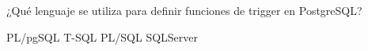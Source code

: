 \question[1] ¿Qué lenguaje se utiliza para definir funciones de trigger en PostgreSQL?
\begin{choices}
\CorrectChoice PL/pgSQL
\choice T-SQL
\choice PL/SQL
\choice SQLServer
\end{choices}
